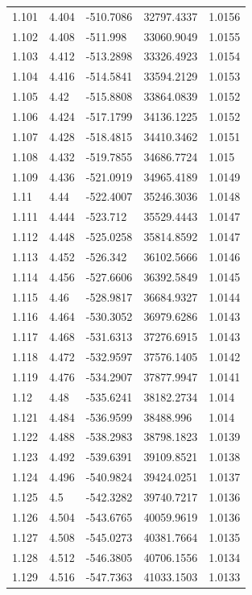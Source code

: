 \begin{tabular}{lllll}
1.101 & 4.404 & -510.7086 & 32797.4337 & 1.0156 \\
1.102 & 4.408 & -511.998 & 33060.9049 & 1.0155 \\
1.103 & 4.412 & -513.2898 & 33326.4923 & 1.0154 \\
1.104 & 4.416 & -514.5841 & 33594.2129 & 1.0153 \\
1.105 & 4.42 & -515.8808 & 33864.0839 & 1.0152 \\
1.106 & 4.424 & -517.1799 & 34136.1225 & 1.0152 \\
1.107 & 4.428 & -518.4815 & 34410.3462 & 1.0151 \\
1.108 & 4.432 & -519.7855 & 34686.7724 & 1.015 \\
1.109 & 4.436 & -521.0919 & 34965.4189 & 1.0149 \\
1.11 & 4.44 & -522.4007 & 35246.3036 & 1.0148 \\
1.111 & 4.444 & -523.712 & 35529.4443 & 1.0147 \\
1.112 & 4.448 & -525.0258 & 35814.8592 & 1.0147 \\
1.113 & 4.452 & -526.342 & 36102.5666 & 1.0146 \\
1.114 & 4.456 & -527.6606 & 36392.5849 & 1.0145 \\
1.115 & 4.46 & -528.9817 & 36684.9327 & 1.0144 \\
1.116 & 4.464 & -530.3052 & 36979.6286 & 1.0143 \\
1.117 & 4.468 & -531.6313 & 37276.6915 & 1.0143 \\
1.118 & 4.472 & -532.9597 & 37576.1405 & 1.0142 \\
1.119 & 4.476 & -534.2907 & 37877.9947 & 1.0141 \\
1.12 & 4.48 & -535.6241 & 38182.2734 & 1.014 \\
1.121 & 4.484 & -536.9599 & 38488.996 & 1.014 \\
1.122 & 4.488 & -538.2983 & 38798.1823 & 1.0139 \\
1.123 & 4.492 & -539.6391 & 39109.8521 & 1.0138 \\
1.124 & 4.496 & -540.9824 & 39424.0251 & 1.0137 \\
1.125 & 4.5 & -542.3282 & 39740.7217 & 1.0136 \\
1.126 & 4.504 & -543.6765 & 40059.9619 & 1.0136 \\
1.127 & 4.508 & -545.0273 & 40381.7664 & 1.0135 \\
1.128 & 4.512 & -546.3805 & 40706.1556 & 1.0134 \\
1.129 & 4.516 & -547.7363 & 41033.1503 & 1.0133 \\

\end{tabular}
